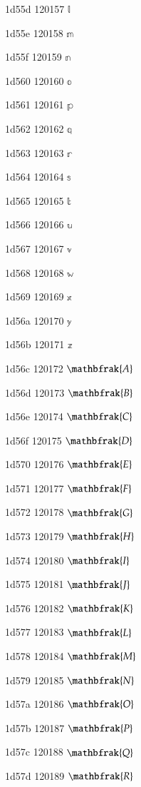 \documentclass[11pt]{article}
\begin{document}
1d55d 120157 \ensuremath{\mathbb{l}}

1d55e 120158 \ensuremath{\mathbb{m}}

1d55f 120159 \ensuremath{\mathbb{n}}

1d560 120160 \ensuremath{\mathbb{o}}

1d561 120161 \ensuremath{\mathbb{p}}

1d562 120162 \ensuremath{\mathbb{q}}

1d563 120163 \ensuremath{\mathbb{r}}

1d564 120164 \ensuremath{\mathbb{s}}

1d565 120165 \ensuremath{\mathbb{t}}

1d566 120166 \ensuremath{\mathbb{u}}

1d567 120167 \ensuremath{\mathbb{v}}

1d568 120168 \ensuremath{\mathbb{w}}

1d569 120169 \ensuremath{\mathbb{x}}

1d56a 120170 \ensuremath{\mathbb{y}}

1d56b 120171 \ensuremath{\mathbb{z}}

1d56c 120172 \ensuremath{\mathbfrak{A}}

1d56d 120173 \ensuremath{\mathbfrak{B}}

1d56e 120174 \ensuremath{\mathbfrak{C}}

1d56f 120175 \ensuremath{\mathbfrak{D}}

1d570 120176 \ensuremath{\mathbfrak{E}}

1d571 120177 \ensuremath{\mathbfrak{F}}

1d572 120178 \ensuremath{\mathbfrak{G}}

1d573 120179 \ensuremath{\mathbfrak{H}}

1d574 120180 \ensuremath{\mathbfrak{I}}

1d575 120181 \ensuremath{\mathbfrak{J}}

1d576 120182 \ensuremath{\mathbfrak{K}}

1d577 120183 \ensuremath{\mathbfrak{L}}

1d578 120184 \ensuremath{\mathbfrak{M}}

1d579 120185 \ensuremath{\mathbfrak{N}}

1d57a 120186 \ensuremath{\mathbfrak{O}}

1d57b 120187 \ensuremath{\mathbfrak{P}}

1d57c 120188 \ensuremath{\mathbfrak{Q}}

1d57d 120189 \ensuremath{\mathbfrak{R}}
\end{document}
